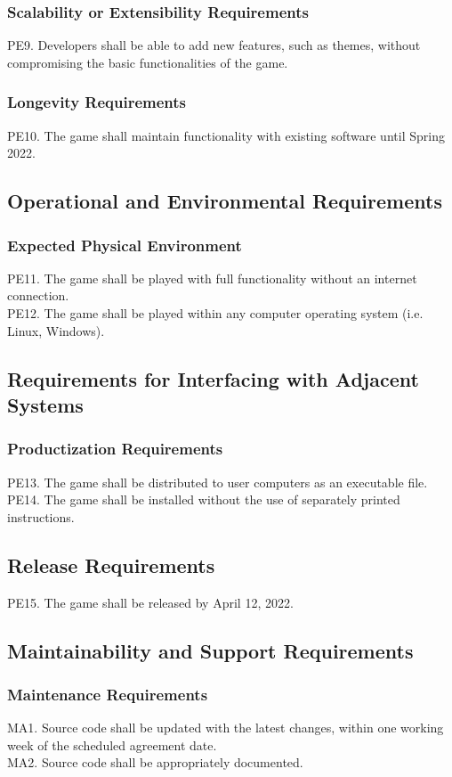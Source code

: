 \documentclass[12pt]{article}
\begin{document}
	\subsubsection{Scalability or Extensibility Requirements}
	PE9. Developers shall be able to add new features, such as themes, without compromising the basic functionalities of the game. 
	
	\subsubsection{Longevity Requirements}
	PE10. The game shall maintain functionality with existing software until Spring 2022.
	
	\subsection{Operational and Environmental Requirements}
	\subsubsection{Expected Physical Environment}
	PE11. The game shall be played with full functionality without an internet connection.\\
	PE12. The game shall be played within any computer operating system (i.e. Linux, Windows).
	
	\subsection{Requirements for Interfacing with Adjacent Systems}
	\subsubsection{Productization Requirements}
	PE13. The game shall be distributed to user computers as an executable file.\\
	PE14. The game shall be installed without the use of separately printed instructions.
	
	\subsection{Release Requirements}
	PE15. The game shall be released by April 12, 2022.
	
	\subsection{Maintainability and Support Requirements}
	\subsubsection{Maintenance Requirements}
	MA1. Source code shall be updated with the latest changes, within one working week of the scheduled agreement date.\\
	MA2. Source code shall be appropriately documented.
	
\end{document}
